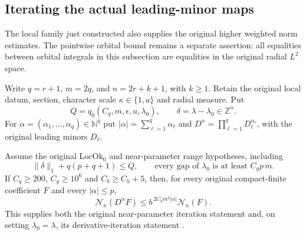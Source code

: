 \subsection{Iterating the actual leading-minor maps}
\label{archimedean-iterated-minors}

The local family just constructed also supplies the original
higher weighted norm estimates. The pointwise orbital bound remains
a separate assertion: all equalities between orbital integrals in
this subsection are equalities in the original radial $L^2$ space.

Write $q=r+1$, $m=2q$, and $n=2r+k+1$, with $k\ge1$.
Retain the original local datum, section, character scale
$\kappa\in\{1,a\}$ and radial measure. Put
\[
 Q=q_0(C_q,m,\epsilon,u,\lambda_0),\qquad
 \delta=\lambda-\lambda_0\in\mathbb Z^n .
\]
For $\alpha=(\alpha_1,\ldots,\alpha_q)\in\mathbb N^q$ put
$|\alpha|=\sum_{\ell=1}^q\alpha_\ell$ and
$D^\alpha=\prod_{\ell=1}^qD_\ell^{\alpha_\ell}$, with the
original leading minors $D_\ell$.

\begin{theorem}\label{original-iterated-minor-norm}
Assume the original $\mathrm{LocOk}_0$ and near-parameter range
hypotheses, including
\[
 \|\delta\|_1+q(p+q+1)\le Q,\qquad
 \text{every gap of }\lambda_0\text{ is at least }C_gp\,m .
\]
If $C_q\ge200$, $C_g\ge10^6$ and $C_b\ge C_h+5$, then, for
every original compact-finite coefficient $F$ and every
$|\alpha|\le p$,
\[
 \mathcal N_\kappa(D^\alpha F)
 \le b^{\,2C_bm^2|\alpha|}\mathcal N_\kappa(F).
\]
This supplies both the original near-parameter iteration statement
and, on setting $\lambda_0=\lambda$, its derivative-iteration
statement \cite{iterated-minors-source}.
\end{theorem}

